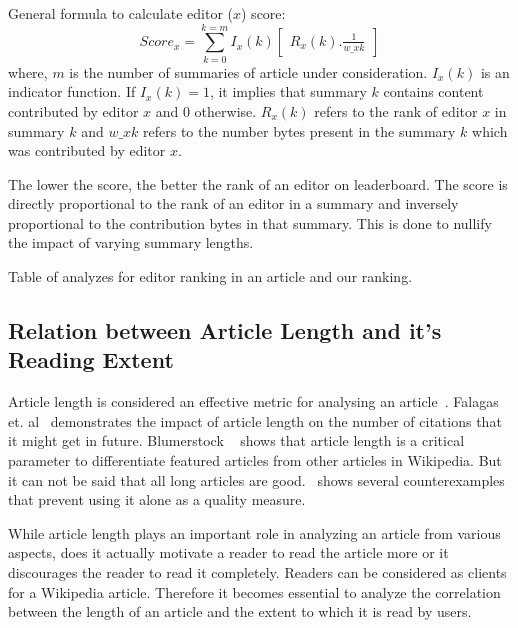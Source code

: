 \documentclass[12pt]{article}
\begin{document}
General formula to calculate editor ($x$) score:
\begin{equation}
	Score_x = \sum_{k=0}^{k=m}I_x(k)\begin{bmatrix}R_x(k).\frac{1}{w\_xk}\end{bmatrix}
\end{equation}
    where, $m$ is the number of summaries of article under consideration. $I_x(k)$ is an indicator function. 
If $I_x(k)=1$, it implies that summary $k$ contains content contributed by editor $x$ and 0 otherwise.
$R_x(k)$ refers to the rank of editor $x$ in summary $k$ and $w\_xk$ refers to the number bytes present in the summary $k$ which was contributed by editor $x$.

The lower the score, the better the rank of an editor on leaderboard. The score is directly proportional to the rank of an editor in a summary and inversely proportional to the contribution bytes in that summary. This is done to nullify the impact of varying summary lengths.



Table of analyzes for editor ranking in an article and our ranking.


    
\subsection{Relation between Article Length and it's Reading Extent}    
Article length is considered an effective metric for analysing an article~\cite{chevalier2010wikipediaviz, dang2016quality}.   Falagas et. al~\cite{falagas2013impact} demonstrates the impact of article length on the number of citations that it might get in future. Blumerstock ~\cite{blumenstock2008size} shows that article length is a critical parameter  to differentiate featured articles from other articles in Wikipedia. 
But it can not be said that all long articles are good.~\cite{blumenstock2008size} shows several counterexamples that prevent using it alone as a quality measure.

While article length plays an important role in analyzing an article from various aspects, does it actually motivate a reader to read the article more or it discourages the reader to read it completely. Readers can be considered as clients for a Wikipedia article. Therefore it becomes essential to analyze the correlation between the length of an article and the extent to which it is read by users.
\end{document}
